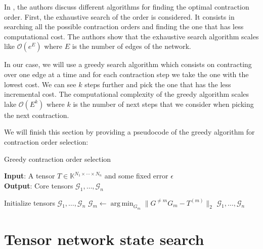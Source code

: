 \documentclass[11pt,a4paper,openright,oneside]{book}
\numberwithin{equation}{section}
\DeclareMathOperator*{\argmin}{arg\,min}
\begin{document}
{In \cite{schindlerAlgorithmsTensorNetwork2020}, the authors discuss different algorithms for finding the optimal contraction order. 
First, the exhaustive search of the order is considered. It consists in searching all the possible contraction orders and finding the
one that has less computational cost. The authors show that the exhaustive search algorithm scales like $\mathcal{O}(e^E)$ where $E$ is the number
of edges of the network.

In our case, we will use a greedy search algorithm which consists on contracting over one edge at a time and for each
contraction step we take the one with the lowest cost. We can see $k$ steps further
and pick the one that has the less incremental cost. The computational complexity of the greedy algorithm scales lake
$\mathcal{O}(E^k)$ where $k$ is the number of next steps that we consider when picking the next contraction.

We will finish this section by providing a pseudocode of the greedy algorithm for contraction order selection:

\begin{algorithm}[H]
    \caption{Greedy contraction order selection}

    \hspace*{\algorithmicindent} \textbf{Input}: A tensor $T \in \mathbb{K}^{N_1 \times \cdots \times N_n}$ and some fixed error $\epsilon$ \\
    \hspace*{\algorithmicindent} \textbf{Output}: Core tensors $\mathcal{G}_1, \dots, \mathcal{G}_n$ 

    \begin{algorithmic}[1]
        \State Initialize tensors $\mathcal{G}_1, \dots, \mathcal{G}_n$
            \State $\mathcal{G}_m \leftarrow \argmin_{G_m} \|G^{\neq m} G_m - T^{(m)}\|_2$
            \EndFor
        \EndWhile
        \State \Return $\mathcal{G}_1, \dots, \mathcal{G}_n$

    \end{algorithmic}

\end{algorithm}



\chapter{Tensor network state search}

}
\end{document}
